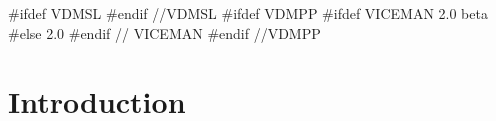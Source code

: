 \documentclass[\pformat,12pt]{article}
\begin{document}

#ifdef VDMSL
#endif //VDMSL
#ifdef VDMPP
#ifdef VICEMAN
        {2.0 beta}
#else
        {2.0}
#endif // VICEMAN
#endif //VDMPP


\newcommand{\Lit}[1]{`{\tt #1}\Quote}
\newcommand{\Rule}[2]{
  \begin{quote}\begin{tabbing}
    #1\index{#1}\ \ \= = \ \ \= #2  ; %
    
  \end{tabbing}\end{quote}
  }
\newcommand{\SeqPt}[1]{\{\ #1\ \}}
\newcommand{\lfeed}{\\ \> \>}
\newcommand{\dsepl}{\ $|$\ }
\newcommand{\dsep}{\\ \> $|$ \>}
\newcommand{\Lop}[1]{`{\sf #1}\Quote}
\newcommand{\blankline}{\vspace{\baselineskip}}
\newcommand{\Brack}[1]{(\ #1\ )}
\newcommand{\nmk}{\footnotemark}
\newcommand{\ntext}[1]{\footnotetext{{\bf Note: } #1}}
\newlength{\kwlen}
\newcommand{\Keyw}[1]{\settowidth{\kwlen}{\tt #1}\makebox[\kwlen][l]{\sf
    #1}}
\newcommand{\keyw}[1]{{\sf #1}}
\newcommand{\id}[1]{{\tt #1}}
\newcommand{\metaiv}[1]{\begin{alltt}\end{alltt}}

\newcommand{\OptPt}[1]{[\ #1\ ]}
\newcommand{\MAP}[2]{\kw{map }#1\kw{ to }#2}
\newcommand{\INMAP}[2]{\kw{inmap }#1\kw{ to }#2}
\newcommand{\SEQ}[1]{\kw{seq of }#1}
\newcommand{\NSEQ}[1]{\kw{seq1 of }#1}
\newcommand{\SET}[1]{\kw{set of }#1}
\newcommand{\PROD}[2]{#1 * #2}
\newcommand{\TO}[2]{$#1 \To #2$}
\newcommand{\FUN}[2]{#1 \To #2}
\newcommand{\PUBLIC}{\ifthenelse{\boolean{VDMpp}}{public\mbox{}}{\mbox{}}}
\newcommand{\PRIVATE}{\ifthenelse{\boolean{VDMpp}}{private}{\mbox{}}}
\newcommand{\PROTECTED}{\ifthenelse{\boolean{VDMpp}}{protected}{\mbox{}}}




\section{Introduction}
\end{document}
